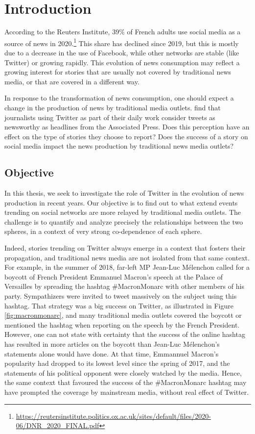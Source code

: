 \chapter{Introduction}
According to the Reuters Institute, 39\% of French adults use social media as a source of news in 2020.\footnote{\url{https://reutersinstitute.politics.ox.ac.uk/sites/default/files/2020-06/DNR_2020_FINAL.pdf}}  This share has declined since 2019, but this is mostly due to a decrease in the use of Facebook, while other networks are stable (like Twitter) or growing rapidly. This evolution of news consumption may reflect a growing interest for stories that are usually not covered by traditional news media, or that are covered in a different way.


In response to the transformation of news consumption, one should expect a change in the production of news by traditional media outlets. \citet{mcgregor_twitter_2018} find that journalists using Twitter as part of their daily work consider tweets as newsworthy as headlines from the Associated Press. Does this perception have an effect on the type of stories they choose to report? Does the success of a story on social media impact the news production by traditional news media outlets?

\section{Objective}

In this thesis, we seek to investigate the role of Twitter in the evolution of news production in recent years. Our objective is to find out to what extend events trending on social networks are more relayed by traditional media outlets. The challenge is to quantify and analyze precisely the relationships between the two spheres, in a context of very strong co-dependence of each sphere.

Indeed, stories trending on Twitter always emerge in a context that fosters their propagation, and traditional news media are not isolated from that same context. For example, in the summer of 2018, far-left MP Jean-Luc Mélenchon called for a boycott of French President Emmanuel Macron's speech at the Palace of Versailles by spreading the hashtag \#MacronMonarc with other members of his party. Sympathizers were invited to tweet massively on the subject using this hashtag. That strategy was a big success on Twitter, as illustrated in Figure \ref{fig:macronmonarc}, and many traditional media outlets covered the boycott or mentioned the hashtag when reporting on the speech by the French President. However, one can not state with certainty that the success of the online hashtag has resulted in more articles on the boycott than Jean-Luc Mélenchon's statements alone would have done. At that time, Emmannuel Macron's popularity had dropped to its lowest level since the spring of 2017, and the statements of his political opponent were closely watched by the media. Hence, the same context that favoured the success of the \#MacronMonarc hashtag may have prompted the coverage by mainstream media, without real effect of Twitter. 

